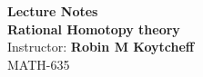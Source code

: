 
\begin{titlepage}
	\centering
	
	\begin{center}
		
		\vspace*{\fill}
		\textbf{\Large{Lecture Notes \\ [0.5cm] Rational Homotopy theory}}\\[0.5cm]
		{\large Instructor:} \textbf{Robin M Koytcheff}\\ [0.5cm]
		MATH-635\\
		\vspace*{\fill}
		
	\end{center}
\end{titlepage}